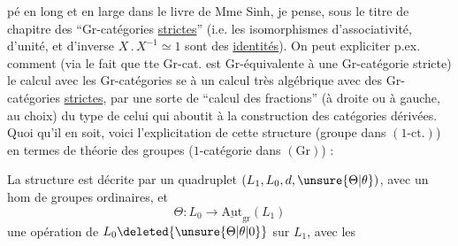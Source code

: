 %
pé en long et en large dans le livre de Mme Sinh, je pense, sous le titre de chapitre des ``Gr-catégories \uline{strictes}'' (i.e.  les isomorphismes d'associativité, d'unité, et d'inverse $X\mathbin{.}X^{-1}\simeq1$ sont des \uline{identités}). On peut expliciter p.ex. comment (via le fait que tte Gr-cat. est Gr-équivalente à une Gr-catégorie stricte) le calcul avec les Gr-catégories se  à un calcul très algébrique avec des Gr-catégories \uline{strictes}, par une sorte de ``calcul des fractions'' (à droite ou à gauche, au choix) du type de celui qui aboutit à la construction des catégories dérivées. Quoi qu'il en soit, voici l'explicitation de cette structure (groupe dans $(1\text{-ct.})$) en termes de théorie des groupes ($1$-catégorie dans $(\mathrm{Gr})$) :

La structure est décrite par un quadruplet $(L_1,L_0,d,\unsure{\Theta|\theta})$, avec
un hom de groupes ordinaires, et
\[
\Theta:L_0\longrightarrow\underline{\mathrm{Aut}}_{\mathrm{gr}}(L_1)
\]
une opération de $L_0\deleted{\unsure{\Theta|\theta|0}}$ sur $L_1$, avec les
